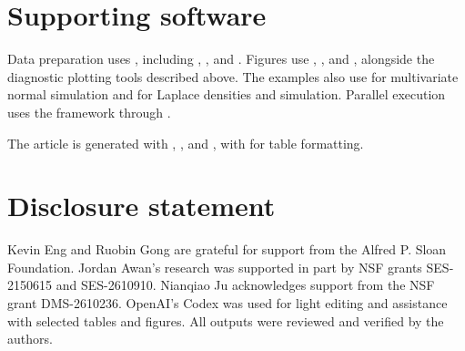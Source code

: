 \section*{Supporting software}\label{supporting-software}

Data preparation uses  \citep{tidyverse_pkg}, including
 \citep{dplyr_pkg},  \citep{tibble_pkg}, and
 \citep{tidyr_pkg}. Figures use  \citep{ggplot2_pkg},
 \citep{ggsci_pkg}, and  \citep{scales_pkg}, alongside
the diagnostic plotting tools described above. The examples also use
 \citep{MASS_pkg} for multivariate normal simulation and
 \citep{VGAM_pkg} for Laplace densities and simulation. Parallel
execution uses the  framework \citep{future_pkg} through
.

The article is generated with  \citep{rmarkdown_pkg},
 \citep{knitr_pkg}, and  \citep{rjtools_pkg}, with
 \citep{kableExtra_pkg} for table formatting.

\section*{Disclosure statement}\label{disclosure-statement}

Kevin Eng and Ruobin Gong are grateful for support from the Alfred P. Sloan Foundation. Jordan Awan's research was supported in part by NSF grants SES-2150615 and SES-2610910. Nianqiao Ju acknowledges support from the NSF grant DMS-2610236. OpenAI's Codex was used for light editing and assistance with selected tables and figures. All outputs were reviewed and verified by the authors.



\address{%
Kevin Eng\\
Rutgers University\\%
Department of Statistics\\ Piscataway, NJ 08854\\
%
%
%
\href{mailto:ke157@stat.rutgers.edu}{\nolinkurl{ke157@stat.rutgers.edu}}%
}

\address{%
Jordan A. Awan\\
University of Pittsburgh\\%
Department of Statistics\\ Pittsburgh, PA 15260\\
%
\url{https://jordan-awan.com/}\\%
%
\href{mailto:jaa557@pitt.edu}{\nolinkurl{jaa557@pitt.edu}}%
}

